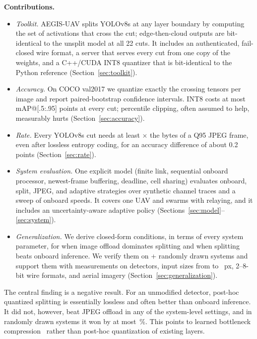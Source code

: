 \documentclass[journal,twocolumn,10pt]{IEEEtran}
\begin{document}
\textbf{Contributions.}
\begin{itemize}
\item \emph{Toolkit.} AEGIS-UAV splits YOLOv8s at any layer boundary by computing the set of activations that cross the cut; edge-then-cloud outputs are bit-identical to the unsplit model at all 22 cuts. It includes an authenticated, fail-closed wire format, a server that serves every cut from one copy of the weights, and a C++/CUDA INT8 quantizer that is bit-identical to the Python reference (Section~\ref{sec:toolkit}).
\item \emph{Accuracy.} On COCO val2017 we quantize exactly the crossing tensors per image and report paired-bootstrap confidence intervals. INT8 costs at most \MaxAbsDeltaINT{} mAP@[.5:.95] points at every cut; percentile clipping, often assumed to help, measurably hurts (Section~\ref{sec:accuracy}).
\item \emph{Rate.} Every YOLOv8s cut needs at least \RatioMinSplitOverJPEGQNinetyFive$\times$ the bytes of a Q95 JPEG frame, even after lossless entropy coding, for an accuracy difference of about 0.2 points (Section~\ref{sec:rate}).
\item \emph{System evaluation.} One explicit model (finite link, sequential onboard processor, newest-frame buffering, deadline, cell sharing) evaluates onboard, split, JPEG, and adaptive strategies over synthetic channel traces and a sweep of onboard speeds. It covers one UAV and swarms with relaying, and it includes an uncertainty-aware adaptive policy (Sections~\ref{sec:model}--\ref{sec:system}).
\item \emph{Generalization.} We derive closed-form conditions, in terms of every system parameter, for when image offload dominates splitting and when splitting beats onboard inference. We verify them on \GenNScenarios{} + \GenNSwarmScenarios{} randomly drawn systems and support them with measurements on \GenNModels{} detectors, input sizes from \GenResSizeSmall{} to \GenResSizeLarge~px, 2--8-bit wire formats, and aerial imagery (Section~\ref{sec:generalization}).
\end{itemize}
The central finding is a negative result. For an unmodified detector, post-hoc quantized splitting is essentially lossless and often better than onboard inference. It did not, however, beat JPEG offload in any of the \NumCells{} system-level settings, and in randomly drawn systems it won by at most \GenMaxSplitGainPct\,\%. This points to learned bottleneck compression~\cite{matsubara2023sc2,shao2020bottlenetpp} rather than post-hoc quantization of existing layers.
\end{document}
